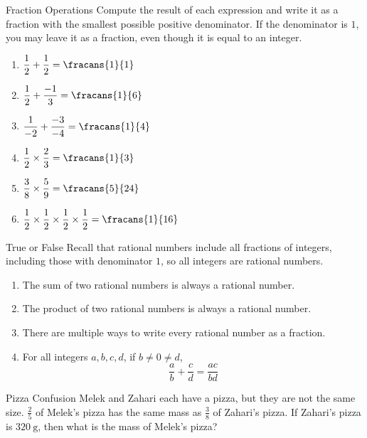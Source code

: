 \documentclass[12pt,letterpaper]{article}
\begin{document}
\begin{problem}{Fraction Operations}
  Compute the result of each expression and write it as a fraction with the smallest
  possible positive denominator. If the denominator is \(1\), you may leave it as a
  fraction, even though it is equal to an integer.

  \begin{multicols}{2}
  \begin{enumerate}[\hspace{.5cm}a.]
  \item \( \displaystyle \frac{1}{2} + \frac{1}{2} = \fracans{1}{1} \)
  \item \( \displaystyle \frac{1}{2} + \frac{-1}{3} = \fracans{1}{6} \)
  \item \( \displaystyle \frac{1}{-2} + \frac{-3}{-4} = \fracans{1}{4} \)
  \item \( \displaystyle \frac{1}{2} \times \frac{2}{3} = \fracans{1}{3} \)
  \item \( \displaystyle \frac{3}{8} \times \frac{5}{9} = \fracans{5}{24} \)
  \item \( \displaystyle \frac{1}{2} \times \frac{1}{2} \times \frac{1}{2} \times
  \frac{1}{2} = \fracans{1}{16} \)
  \end{enumerate}
  \end{multicols}
\end{problem}

\begin{problem}{True or False}
  Recall that rational numbers include all fractions of integers, including those with denominator \(1\), so all integers are rational numbers.

  \begin{enumerate}
    \item The sum of two rational numbers is always a rational number.
    \hfill \TFTrue
    \item The product of two rational numbers is always a rational number.
    \hfill \TFTrue
    \item There are multiple ways to write every rational number as a fraction.
    \hfill \TFTrue
    \item For all integers \(a, b, c, d\), if \(b \ne 0 \ne d\), \[
      \frac{a}{b} + \frac{c}{d} = \frac{ac}{bd}
    \] \hfill \TFFalse
  \end{enumerate}
\end{problem}

\begin{problem}{Pizza Confusion}
  Melek and Zahari each have a pizza, but they are not the same size. \(\frac{2}{5}\) of
  Melek's pizza has the same mass as \(\frac{3}{8}\) of Zahari's pizza. If Zahari's pizza is
  \(\SI{320}{\gram}\), then what is the mass of Melek's pizza? \hfill {}
\end{problem}
\end{document}
